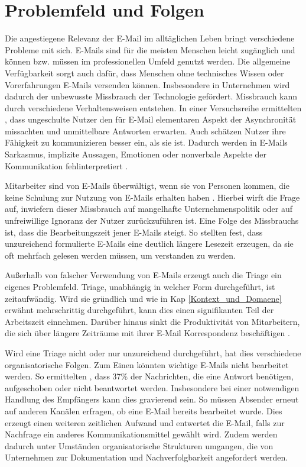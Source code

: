 
\section{Problemfeld und Folgen}
\label{Problemfeld_und_Folgen}

Die angestiegene Relevanz der E-Mail im alltäglichen Leben bringt verschiedene Probleme mit sich. E-Mails sind für die meisten Menschen leicht zugänglich und können bzw. müssen im professionellen Umfeld genutzt werden. Die allgemeine Verfügbarkeit sorgt auch dafür, dass Menschen ohne technisches Wissen oder Vorerfahrungen E-Mails versenden können. Insbesondere in Unternehmen wird dadurch der unbewusste Missbrauch der Technologie gefördert. Missbrauch kann durch verschiedene Verhaltensweisen entstehen. In einer Versuchsreihe ermittelten \cite[S. 267]{Thomas2006}, dass ungeschulte Nutzer den für E-Mail elementaren Aspekt der Asynchronität missachten und unmittelbare Antworten erwarten. Auch schätzen Nutzer ihre Fähigkeit zu kommunizieren besser ein, als sie ist. Dadurch werden in E-Mails Sarkasmus, implizite Aussagen, Emotionen oder nonverbale Aspekte der Kommunikation fehlinterpretiert \citep[S. 933]{Kruger2005}.

Mitarbeiter sind von E-Mails überwältigt, wenn sie von Personen kommen, die keine Schulung zur Nutzung von E-Mails erhalten haben \citep[S. 179, S. 194]{Dawley2003}. Hierbei wirft \cite[S. 77]{Lagrana2016} die Frage auf, inwiefern dieser Missbrauch auf mangelhafte Unternehmenspolitik oder auf unfreiwillige Ignoranz der Nutzer zurückzuführen ist. Eine Folge des Missbrauchs ist, dass die Bearbeitungszeit jener E-Mails steigt. So stellten \cite[S. 1331 f.]{Friedman2003} fest, dass unzureichend formulierte E-Mails eine deutlich längere Lesezeit erzeugen, da sie oft mehrfach gelesen werden müssen, um verstanden zu werden.

Außerhalb von falscher Verwendung von E-Mails erzeugt auch die Triage ein eigenes Problemfeld. Triage, unabhängig in welcher Form durchgeführt, ist zeitaufwändig. Wird sie gründlich und wie in Kap \ref{Kontext_und_Domaene} erwähnt mehrschrittig durchgeführt, kann dies einen signifikanten Teil der Arbeitszeit einnehmen. Darüber hinaus sinkt die Produktivität von Mitarbeitern, die sich über längere Zeiträume mit ihrer E-Mail Korrespondenz beschäftigen \citep[S. 1723 f.]{Mark2016}.

\noindent Wird eine Triage nicht oder nur unzureichend durchgeführt, hat dies verschiedene organisatorische Folgen. Zum Einen könnten wichtige E-Mails nicht bearbeitet werden. So ermittelten \cite{Dabbish2006}, dass 37\% der Nachrichten, die eine Antwort benötigen, aufgeschoben oder nicht beantwortet werden. Insbesondere bei einer notwendigen Handlung des Empfängers kann dies gravierend sein. So müssen Absender erneut auf anderen Kanälen erfragen, ob eine E-Mail bereits bearbeitet wurde. Dies erzeugt einen weiteren zeitlichen Aufwand und entwertet die E-Mail, falls zur Nachfrage ein anderes Kommunikationsmittel gewählt wird. Zudem werden dadurch unter Umständen organisatorische Strukturen umgangen, die von Unternehmen zur Dokumentation und Nachverfolgbarkeit angefordert werden.


